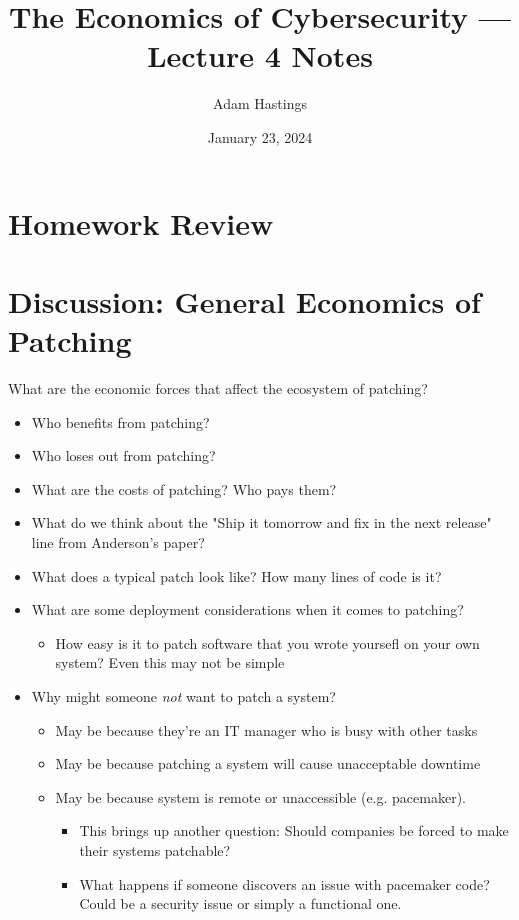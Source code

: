 \documentclass[11pt]{article}
\title{The Economics of Cybersecurity --- Lecture 4 Notes}
\date{January 23, 2024}
\author{Adam Hastings}
\begin{document}
\maketitle


\section*{Homework Review}

\section*{Discussion: General Economics of Patching}

What are the economic forces that affect the ecosystem of patching?
\begin{itemize}
    \item Who benefits from patching?
    \item Who loses out from patching?
    \item What are the costs of patching? Who pays them?
    \item What do we think about the "Ship it tomorrow and fix in the next release" line from Anderson's paper?
    \item What does a typical patch look like? How many lines of code is it?
    \item What are some deployment considerations when it comes to patching?
    \begin{itemize}
        \item How easy is it to patch software that you wrote yoursefl on your own system? Even this may not be simple
    \end{itemize}
    \item Why might someone {\it not} want to patch a system?
    \begin{itemize}
        \item May be because they're an IT manager who is busy with other tasks
        \item May be because patching a system will cause unacceptable downtime 
        \item May be because system is remote or unaccessible (e.g. pacemaker). 
        \begin{itemize}
            \item This brings up another question:  Should companies be forced to make their systems patchable?
            \item What happens if someone discovers an issue with pacemaker code? Could be a security issue or simply a functional one. 

\end{itemize}
\end{itemize}
\end{itemize}
\end{document}
